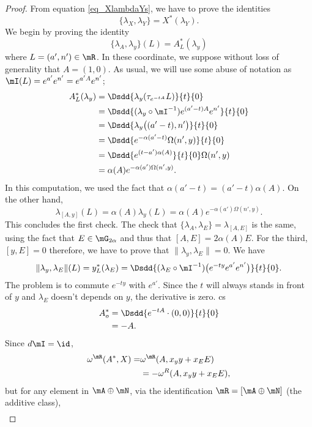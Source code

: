 \begin{proof}
From equation \eqref{eq_XlambdaYs}, we have to prove the identities 
\[ 
  \{ \lambda_X,\lambda_Y \}=X^*(\lambda_Y).
\]
We begin by proving the identity
\[ 
  \{ \lambda_A,\lambda_y \}(L)=A^*_L(\lambda_y)
\]
where $L=(a',n')\in\mR$. In these coordinate, we suppose without loss of generality that $A=(1,0)$. As usual, we will use some abuse of notation as $\mI(L)= e^{a'} e^{n'}= e^{a'A} e^{n'}$;
\begin{equation}
\begin{split}
  A^*_L(\lambda_y)&=\Dsdd{ \lambda_y(\tau_{ e^{-tA}}L) }{t}{0}\\
		&=\Dsdd{ (\lambda_y\circ\mI ^{-1}) e^{(a'-t)A} e^{n'} }{t}{0}\\
		&=\Dsdd{ \lambda_y\big( (a'-t),n' \big) }{t}{0}\\
		&=\Dsdd{  e^{-\alpha(a'-t)}\Omega(n',y) }{t}{0}\\
		&=\Dsdd{  e^{(t-a')\alpha(A)} }{t}{0}\Omega(n',y)\\
		&=\alpha(A) e^{-\alpha(a')\Omega(n',y)}.
\end{split}
\end{equation}
In this computation, we used the fact that $\alpha(a'-t)=(a'-t)\alpha(A)$.
On the other hand, 
\[ 
  \lambda_{[A,y]}(L)=\alpha(A)\lambda_y(L)=\alpha(A) e^{-\alpha(a')\Omega(n',y)}.
\]
This concludes the first check. The check that $\{ \lambda_A,\lambda_E \}=\lambda_{[A,E]}$ is the same, using the fact that $E\in\mG_{2\alpha}$ and thus that $[A,E]=2\alpha(A)E$. For the third, $[y,E]=0$ therefore, we have to prove that $\| \lambda_y,\lambda_E \|=0$. We have
\[ 
  \| \lambda_y,\lambda_E \|(L)=y^*_L(\lambda_E)=\Dsdd{ (\lambda_E\circ\mI^{-1})\big(  e^{-ty} e^{a'} e^{n'} \big) }{t}{0}.
\]
The problem is to commute $ e^{-ty}$ with $ e^{a'}$. Since the $t$ will always stands in front of $y$ and $\lambda_E$ doesn't depends on $y$, the derivative is zero.
cs
\[ 
\begin{split}
  A^*_o&=\Dsdd{  e^{-tA}\cdot(0,0) }{t}{0}\\
	&=-A.
\end{split}  
\]
Since $d\mI=\id$, 
\[ 
\begin{split}
\omega^{\mR}(A^*,X)=&\omega^{\mR}(A,x_yy+x_EE)\\
		&=-\omega^{R}(A,x_yy+x_EE),
\end{split}  
\]
but for any element in $\mA\oplus\mN$, via the identification $\mR=[\mA\oplus\mN]$ (the additive class),
\[ 
\begin{split}

\end{split}\]
\end{proof}
